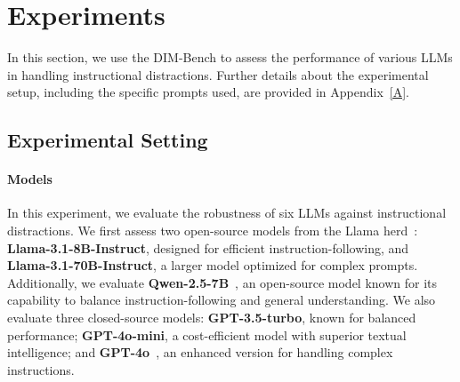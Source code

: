 


\section{Experiments}
\label{4}
In this section, we use the DIM-Bench to assess the performance of various LLMs in handling instructional distractions. Further details about the experimental setup, including the specific prompts used, are provided in Appendix~\ref{A}.

%




\subsection{Experimental Setting}
\label{4.1}
\paragraph{Models}


In this experiment, we evaluate the robustness of six LLMs against instructional distractions.
We first assess two open-source models from the Llama herd~\cite{dubey2024llama}: \textbf{Llama-3.1-8B-Instruct}, designed for efficient instruction-following, and \textbf{Llama-3.1-70B-Instruct}, a larger model optimized for complex prompts.
Additionally, we evaluate \textbf{Qwen-2.5-7B}~\cite{qwen2.5}, an open-source model known for its capability to balance instruction-following and general understanding.
We also evaluate three closed-source models: \textbf{GPT-3.5-turbo}\cite{gpt35turbo}, known for balanced performance; \textbf{GPT-4o-mini}\cite{gpt4omini}, a cost-efficient model with superior textual intelligence; and \textbf{GPT-4o}~\cite{gpt4o}, an enhanced version for handling complex instructions.


